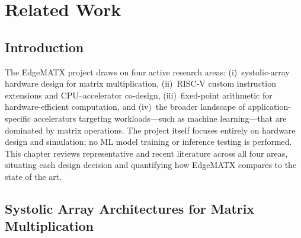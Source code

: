 ﻿\documentclass[12pt,a4paper]{report}
\begin{document}
%
%
%    
%    

\chapter{Related Work}

\section{Introduction}

The EdgeMATX project draws on four
active research areas:
(i)~systolic-array hardware design for matrix multiplication,
(ii)~RISC-V custom instruction extensions and CPU--accelerator
co-design,
(iii)~fixed-point arithmetic for hardware-efficient computation, and
(iv)~the broader landscape of application-specific accelerators
targeting workloads---such as machine learning---that are dominated
by matrix operations.
The project itself focuses entirely on hardware design and
simulation; no ML model training or inference testing is performed.
This chapter reviews representative and recent literature across all
four areas, situating each design decision and quantifying how EdgeMATX
compares to the state of the art.

\section{Systolic Array Architectures for Matrix Multiplication}
\end{document}
